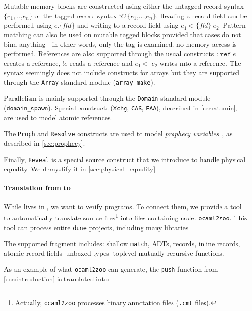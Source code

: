 Mutable memory blocks are constructed using either the untagged record syntax $\texttt{\{} e_1 \texttt{,} \dots \texttt{,} e_n \texttt{\}}$ or the tagged record syntax $\texttt{‘} C\ \texttt{\{} e_1 \texttt{,} \dots \texttt{,} e_n \texttt{\}}$.
Reading a record field can be performed using $e \texttt{.\{} \mathit{fld} \texttt{\}}$ and writing to a record field using $e_1\ \texttt{<-\{} \mathit{fld} \texttt{\}}\ e_2$.
Pattern matching can also be used on mutable tagged blocks provided that cases do not bind anything---in other words, only the tag is examined, no memory access is performed.
References are also supported through the usual constructs : $\texttt{ref}\ e$ creates a reference, $\texttt{!} e$ reads a reference and $e_1\ \texttt{<-}\ e_2$ writes into a reference.
The syntax seemingly does not include constructs for arrays but they are supported through the \texttt{Array} standard module (\eg \texttt{array\_make}).

Parallelism is mainly supported through the \texttt{Domain} standard module (\eg \texttt{domain\_spawn}).
Special constructs (\texttt{Xchg}, \texttt{CAS}, \texttt{FAA}), described in \cref{sec:atomic}, are used to model atomic references.

The \texttt{Proph} and \texttt{Resolve} constructs are used to model \emph{prophecy variables}~\cite{DBLP:journals/pacmpl/JungLPRTDJ20}, as described in \cref{sec:prophecy}.

Finally, \texttt{Reveal} is a special source construct that we introduce to handle physical equality.
We demystify it in \cref{sec:physical_equality}.

\paragraph{Translation from \OCaml to \ZooLang}

While \ZooLang lives in \Coq, we want to verify \OCaml programs.
To connect them, we provide a tool to automatically translate \OCaml source files\footnote{Actually, \texttt{ocaml2zoo} processes binary annotation files (\texttt{.cmt} files).} into \Coq files containing \ZooLang code: \texttt{ocaml2zoo}.
This tool can process entire \texttt{dune} projects, including many libraries.

The supported \OCaml fragment includes: shallow \texttt{match}, ADTs, records, inline records, atomic record fields, unboxed types, toplevel mutually recursive functions.

As an example of what \texttt{ocaml2zoo} can generate, the \texttt{push} function from \cref{sec:introduction} is translated into:

